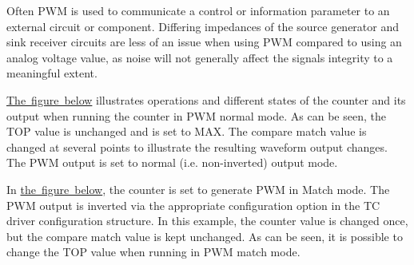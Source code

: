 Often P\+WM is used to communicate a control or information parameter to an external circuit or component. Differing impedances of the source generator and sink receiver circuits are less of an issue when using P\+WM compared to using an analog voltage value, as noise will not generally affect the signal\textquotesingle{}s integrity to a meaningful extent.

\mbox{\hyperlink{group__asfdoc__sam0__tc__group_asfdoc_sam0_tc_module_pwm_normal_diag}{The figure below}} illustrates operations and different states of the counter and its output when running the counter in P\+WM normal mode. As can be seen, the T\+OP value is unchanged and is set to M\+AX. The compare match value is changed at several points to illustrate the resulting waveform output changes. The P\+WM output is set to normal (i.\+e. non-\/inverted) output mode.

\label{group__asfdoc__sam0__tc__group_asfdoc_sam0_tc_module_pwm_normal_diag}%
%
 

In \mbox{\hyperlink{group__asfdoc__sam0__tc__group_asfdoc_sam0_tc_module_pwm_match_diag}{the figure below}}, the counter is set to generate P\+WM in Match mode. The P\+WM output is inverted via the appropriate configuration option in the TC driver configuration structure. In this example, the counter value is changed once, but the compare match value is kept unchanged. As can be seen, it is possible to change the T\+OP value when running in P\+WM match mode.

